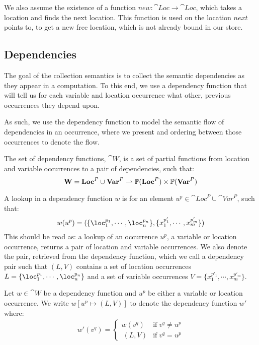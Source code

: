 \documentclass[../../master.tex]{subfiles}
\begin{document}
We also assume the existence of a function $new:\cat{Loc}\rightarrow\cat{Loc}$, which takes a location and finds the next location.
This function is used on the location $next$ points to, to get a new free location, which is not already bound in our store.

\subsection{Dependencies}\label{sec:DepFunc}
The goal of the collection semantics is to collect the semantic dependencies as they appear in a computation. 
To this end, we use a dependency function that will tell us for each variable and location occurrence what other, previous occurrences they depend upon.

As such, we use the dependency function to model the semantic flow of dependencies in an occurrence, where we present and ordering between those occurrences to denote the flow.

\begin{definition}\label{def:DepFunc}
	The set of dependency functions, $\cat{W}$, is a set of partial functions from location and variable occurrences to a pair of dependencies, such that:
	$$\textbf{W}=\textbf{Loc}^P\cup\textbf{Var}^P\rightharpoonup\mathbb{P}(\textbf{Loc}^P)\times\mathbb{P}(\textbf{Var}^P)$$
\end{definition}
A lookup in a dependency function $w$ is for an element $u^p\in\cat{Loc}^P\cup\cat{Var}^P$, such that:
$$w(u^p)=(\{\loc_1^{p_1},\cdots,\loc_n^{p_n}\},\{x_1^{p'_1},\cdots,x_m^{p'_m}\})$$
This should be read as: a lookup of an occurrence $u^p$, a variable or location occurrence, returns a pair of location and variable occurrences.
We also denote the pair, retrieved from the dependency function, which we call a dependency pair such that $(L,V)$ contains a set of location occurrences $L=\{\loc_1^{p_1},\cdots,\loc_n^{p_n}\}$ 
and a set of variable occurrences $V=\{x_1^{p'_1},\cdots,x_m^{p'_m}\}$.

\begin{definition}\label{def:DepExt}
	Let $w\in\cat{W}$ be a dependency function and $u^p$ be either a variable or location occurrence.
	We write $w[u^p\mapsto(L,V)]$ to denote the dependency function $w'$ where:
	\begin{align*}
		w'(v^q)=
		\left\{\begin{matrix}
			w(v^q) & \mbox{if}\;v^q\neq u^p\\\	 
			(L,V) & \mbox{if}\;v^q=u^p
		\end{matrix}\right.
	\end{align*}
\end{definition}
\end{document}
